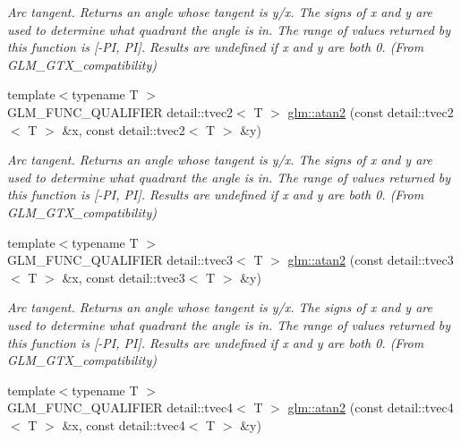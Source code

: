 \begin{DoxyCompactItemize}
\begin{DoxyCompactList}\small\item\em Arc tangent. Returns an angle whose tangent is y/x. The signs of x and y are used to determine what quadrant the angle is in. The range of values returned by this function is \mbox{[}-\/\+P\+I, P\+I\mbox{]}. Results are undefined if x and y are both 0. (From G\+L\+M\+\_\+\+G\+T\+X\+\_\+compatibility) \end{DoxyCompactList}\item 
\hypertarget{group__gtx__compatibility_ga808e842fd066ba7f41c71add20a02730}{}{\footnotesize template$<$typename T $>$ }\\G\+L\+M\+\_\+\+F\+U\+N\+C\+\_\+\+Q\+U\+A\+L\+I\+F\+I\+E\+R detail\+::tvec2$<$ T $>$ \hyperlink{group__gtx__compatibility_ga808e842fd066ba7f41c71add20a02730}{glm\+::atan2} (const detail\+::tvec2$<$ T $>$ \&x, const detail\+::tvec2$<$ T $>$ \&y)\label{group__gtx__compatibility_ga808e842fd066ba7f41c71add20a02730}

\begin{DoxyCompactList}\small\item\em Arc tangent. Returns an angle whose tangent is y/x. The signs of x and y are used to determine what quadrant the angle is in. The range of values returned by this function is \mbox{[}-\/\+P\+I, P\+I\mbox{]}. Results are undefined if x and y are both 0. (From G\+L\+M\+\_\+\+G\+T\+X\+\_\+compatibility) \end{DoxyCompactList}\item 
\hypertarget{group__gtx__compatibility_gadd42ce7d69bb6a0e75c9f0945fbc2ab5}{}{\footnotesize template$<$typename T $>$ }\\G\+L\+M\+\_\+\+F\+U\+N\+C\+\_\+\+Q\+U\+A\+L\+I\+F\+I\+E\+R detail\+::tvec3$<$ T $>$ \hyperlink{group__gtx__compatibility_gadd42ce7d69bb6a0e75c9f0945fbc2ab5}{glm\+::atan2} (const detail\+::tvec3$<$ T $>$ \&x, const detail\+::tvec3$<$ T $>$ \&y)\label{group__gtx__compatibility_gadd42ce7d69bb6a0e75c9f0945fbc2ab5}

\begin{DoxyCompactList}\small\item\em Arc tangent. Returns an angle whose tangent is y/x. The signs of x and y are used to determine what quadrant the angle is in. The range of values returned by this function is \mbox{[}-\/\+P\+I, P\+I\mbox{]}. Results are undefined if x and y are both 0. (From G\+L\+M\+\_\+\+G\+T\+X\+\_\+compatibility) \end{DoxyCompactList}\item 
\hypertarget{group__gtx__compatibility_ga593a3c43b415ec4a8e87ccfb55570f64}{}{\footnotesize template$<$typename T $>$ }\\G\+L\+M\+\_\+\+F\+U\+N\+C\+\_\+\+Q\+U\+A\+L\+I\+F\+I\+E\+R detail\+::tvec4$<$ T $>$ \hyperlink{group__gtx__compatibility_ga593a3c43b415ec4a8e87ccfb55570f64}{glm\+::atan2} (const detail\+::tvec4$<$ T $>$ \&x, const detail\+::tvec4$<$ T $>$ \&y)\label{group__gtx__compatibility_ga593a3c43b415ec4a8e87ccfb55570f64}


\end{DoxyCompactItemize}
